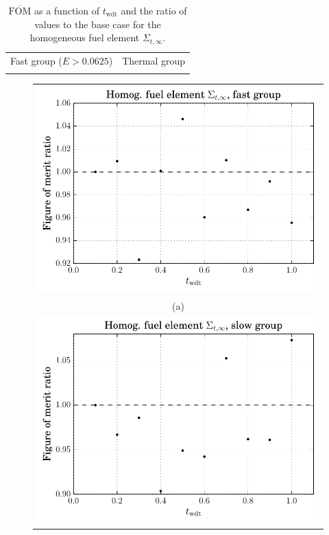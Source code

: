 \begin{table}[hbtp]
  \centering
  \caption[$\overline{\mathrm{FOM}}$ and ratio for
    the homogeneous fuel element $\Sigma_{t,\infty}$.]{$\overline{\mathrm{FOM}}$ as a function of
    $t_{\mathrm{wdt}}$ and the ratio of values to the base case for
    the homogeneous fuel element $\Sigma_{t,\infty}$.}
  \begin{tabular}{cc} Fast group ($E > 0.0625$) & Thermal group \\
    
 &
   
  \end{tabular}
\label{tab:homog_inf_tot}
\end{table}
\begin{figure}[hbtp]
  \centering
  \begin{tabular}{c}
  \includegraphics[scale=0.9]{images/results/homog_inf_tot_grp_comb1} \\
    (a) \\
  \includegraphics[scale=0.9]{images/results/homog_inf_tot_grp_comb2} \\

\end{tabular}
\end{figure}
